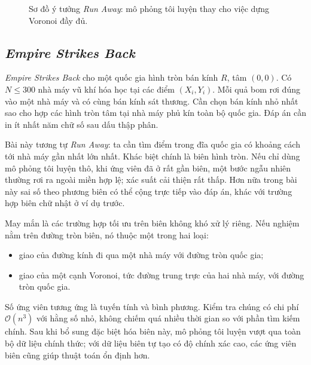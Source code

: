 \documentclass[11pt]{article}
\newcommand{\Oh}{\mathcal{O}}
\begin{document}
\begin{figure}[htbp]
\centering
{}
\caption{Sơ đồ ý tưởng \textit{Run Away}: mô phỏng tôi luyện thay cho việc dựng Voronoi đầy đủ.}
\end{figure}

\subsection{\textit{Empire Strikes Back}}

\textit{Empire Strikes Back} cho một quốc gia hình tròn bán kính \(R\), tâm
\((0,0)\). Có \(N\le 300\) nhà máy vũ khí hóa học tại các điểm
\((X_i,Y_i)\). Mỗi quả bom rơi đúng vào một nhà máy và có cùng bán kính sát
thương. Cần chọn bán kính nhỏ nhất sao cho hợp các hình tròn tâm tại nhà máy
phủ kín toàn bộ quốc gia. Đáp án cần in ít nhất năm chữ số sau dấu thập phân.

Bài này tương tự \textit{Run Away}: ta cần tìm điểm trong đĩa quốc gia có
khoảng cách tới nhà máy gần nhất lớn nhất. Khác biệt chính là biên hình tròn.
Nếu chỉ dùng mô phỏng tôi luyện thô, khi ứng viên đã ở rất gần biên, một bước
ngẫu nhiên thường rơi ra ngoài miền hợp lệ; xác suất cải thiện rất thấp. Hơn
nữa trong bài này sai số theo phương biên có thể cộng trực tiếp vào đáp án,
khác với trường hợp biên chữ nhật ở ví dụ trước.

May mắn là các trường hợp tối ưu trên biên không khó xử lý riêng. Nếu nghiệm
nằm trên đường tròn biên, nó thuộc một trong hai loại:
\begin{itemize}
  \item giao của đường kính đi qua một nhà máy với đường tròn quốc gia;
  \item giao của một cạnh Voronoi, tức đường trung trực của hai nhà máy, với
  đường tròn quốc gia.
\end{itemize}
Số ứng viên tương ứng là tuyến tính và bình phương. Kiểm tra chúng có chi phí
\(\Oh(n^3)\) với hằng số nhỏ, không chiếm quá nhiều thời gian so với phần tìm
kiếm chính. Sau khi bổ sung đặc biệt hóa biên này, mô phỏng tôi luyện vượt qua
toàn bộ dữ liệu chính thức; với dữ liệu biên tự tạo có độ chính xác cao, các
ứng viên biên cũng giúp thuật toán ổn định hơn.
\end{document}

